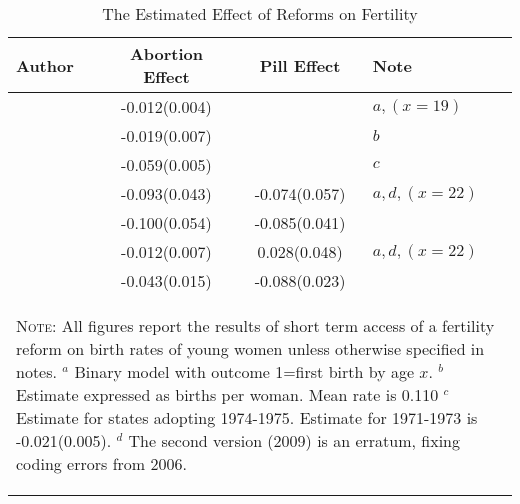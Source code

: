 \begin{table}[htpb!]
\caption{The Estimated Effect of Reforms on Fertility}
\begin{tabular}{lccl} \toprule
Author & Abortion Effect & Pill Effect & Note \\ \midrule
\citet{AngristEvans1996}      & -0.012(0.004) &               & $a,(x=19)$   \\
\citet{Levineetal1996}        & -0.019(0.007) &               & $b$          \\
\citet{Gruberetal1999}        & -0.059(0.005) &               & $c$          \\
\citet{Bailey2006}            & -0.093(0.043) & -0.074(0.057) & $a,d,(x=22)$ \\
\citet{Guldi2008}             & -0.100(0.054) & -0.085(0.041) &              \\
\citet{Bailey2009}            & -0.012(0.007) &  0.028(0.048) & $a,d,(x=22)$ \\
\citet{OltmansHungerman2012}  & -0.043(0.015) & -0.088(0.023) &              \\
\bottomrule
\multicolumn{4}{p{12.2cm}}{\begin{footnotesize}\textsc{Note:} All figures report the
results of short term access of a fertility reform on birth rates of young women 
unless otherwise specified in notes. \newline 
$^a$ Binary model with outcome 1=first birth by age $x$. \newline
$^b$ Estimate expressed as births per woman.  Mean rate is 0.110 \newline 
$^c$ Estimate for states adopting 1974-1975. Estimate for 1971-1973 is 
-0.021(0.005). \newline
$^d$ The second version (2009) is an erratum, fixing coding errors from 2006.
\end{footnotesize}} \\
\end{tabular}
\end{table}

